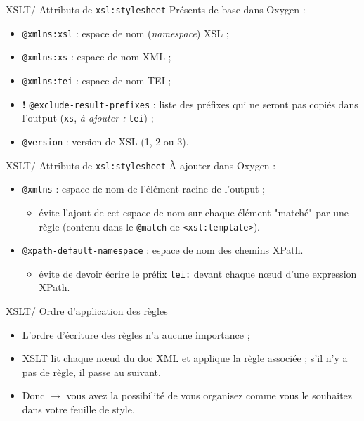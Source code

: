 \documentclass{beamer}
\begin{document}
    \begin{frame}[fragile]{XSLT/ Attributs de \texttt{xsl:stylesheet}}
    \Large
    Présents de base dans Oxygen :
        \begin{itemize}
            \item \texttt{@xmlns:xsl} : espace de nom (\textit{namespace}) XSL ;
            \item \texttt{@xmlns:xs} : espace de nom XML ;
            \item \texttt{@xmlns:tei} : espace de nom TEI ;
            \item \textbf{!} \texttt{@exclude-result-prefixes} : liste des préfixes qui ne seront pas copiés dans l'output (\texttt{xs}, \textit{à ajouter :} \texttt{tei}) ;
            \item \texttt{@version} : version de XSL (1, 2 ou 3).
        \end{itemize}
    \end{frame}

    \begin{frame}[fragile]{XSLT/ Attributs de \texttt{xsl:stylesheet}}
    \Large
    À ajouter dans Oxygen :
    \bigskip
        \begin{itemize}
            \item \texttt{@xmlns} : espace de nom de l'élément racine de l'output ;
            \begin{itemize}
            \large
                \item évite l'ajout de cet espace de nom sur chaque élément "matché" par une règle (contenu dans le \texttt{@match} de \texttt{<xsl:template>}).
            \end{itemize}
            \bigskip
            \item \texttt{@xpath-default-namespace} :  espace de nom des chemins XPath.
            \begin{itemize}
            \large
                \item évite de devoir écrire le préfix \texttt{tei:} devant chaque n\oe ud d'une expression XPath.
            \end{itemize}
        \end{itemize}
    \end{frame}
    
    \begin{frame}[fragile]{XSLT/ Ordre d'application des règles}
    \Large
        \begin{itemize}
            \item L'ordre d'écriture des règles n'a aucune importance ;
            \item XSLT lit chaque n\oe ud du doc XML et applique la règle associée ; s'il n'y a pas de règle, il passe au suivant.
            \item Donc  $\rightarrow$ vous avez la possibilité de vous organisez comme vous le souhaitez dans votre feuille de style.
        \end{itemize}
    \end{frame}
\end{document}
